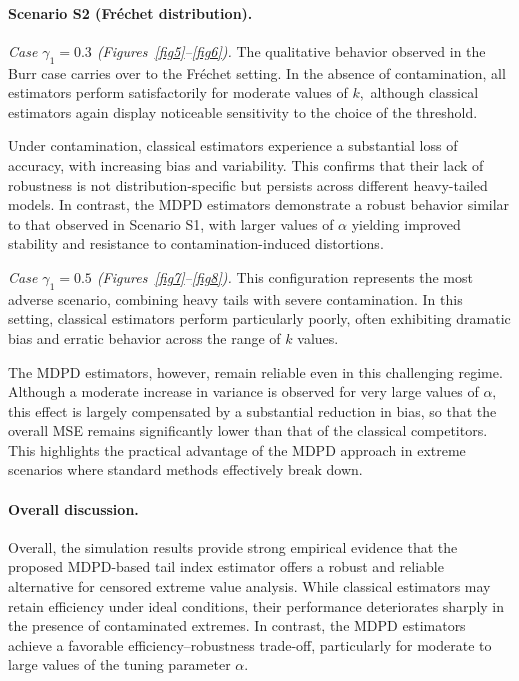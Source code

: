 \documentclass[reqno,openbib,runningheads,a4paper,12pt]{amsart}%
\begin{document}
\paragraph{Scenario S2 (Fr\'echet distribution).}

\noindent\emph{Case $\gamma_{1}=0.3$ (Figures~\ref{fig5}--\ref{fig6}).} The
qualitative behavior observed in the Burr case carries over to the Fr\'{e}chet
setting. In the absence of contamination, all estimators perform
satisfactorily for moderate values of $k,$ although classical estimators again
display noticeable sensitivity to the choice of the threshold.\smallskip

\noindent Under contamination, classical estimators experience a substantial
loss of accuracy, with increasing bias and variability. This confirms that
their lack of robustness is not distribution-specific but persists across
different heavy-tailed models. In contrast, the MDPD estimators demonstrate a
robust behavior similar to that observed in Scenario S1, with larger values of
$\alpha$ yielding improved stability and resistance to contamination-induced
distortions.\smallskip

\noindent\emph{Case $\gamma_{1}=0.5$ (Figures~\ref{fig7}--\ref{fig8}).} This
configuration represents the most adverse scenario, combining heavy tails with
severe contamination. In this setting, classical estimators perform
particularly poorly, often exhibiting dramatic bias and erratic behavior
across the range of $k$ values.\smallskip

\noindent The MDPD estimators, however, remain reliable even in this
challenging regime. Although a moderate increase in variance is observed for
very large values of $\alpha,$ this effect is largely compensated by a
substantial reduction in bias, so that the overall MSE remains significantly
lower than that of the classical competitors. This highlights the practical
advantage of the MDPD approach in extreme scenarios where standard methods
effectively break down.

\paragraph{Overall discussion.}

\noindent Overall, the simulation results provide strong empirical evidence
that the proposed MDPD-based tail index estimator offers a robust and reliable
alternative for censored extreme value analysis. While classical estimators
may retain efficiency under ideal conditions, their performance deteriorates
sharply in the presence of contaminated extremes. In contrast, the MDPD
estimators achieve a favorable efficiency--robustness trade-off, particularly
for moderate to large values of the tuning parameter $\alpha.$\smallskip
\end{document}
